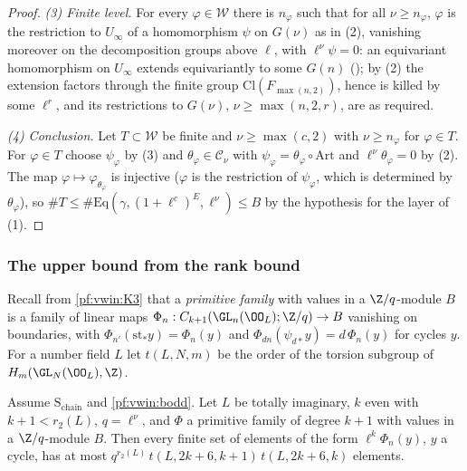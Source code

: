 \begin{proof}
\emph{(3) Finite level.} For every $\varphi\in\mathcal W$ there is $n_\varphi$ such that for all $\nu\ge n_\varphi$, $\varphi$ is the restriction to
$U_\infty$ of a homomorphism $\psi$ on $G(\nu)$ as in (2), vanishing moreover on the decomposition groups above $\ell$, with
$\ell^\nu\psi=0$: an equivariant homomorphism on $U_\infty$ extends equivariantly to some $G(n)$
(); by (2) the extension factors through the finite group $\mathrm{Cl}(F_{\max(n,2)})$, hence is killed
by some $\ell^r$, and its restrictions to $G(\nu)$, $\nu\ge\max(n,2,r)$, are as required.

\emph{(4) Conclusion.} Let $T\subset\mathcal W$ be finite and $\nu\ge\max(c,2)$ with $\nu\ge n_\varphi$ for $\varphi\in T$. For $\varphi\in T$ choose
$\psi_\varphi$ by (3) and $\theta_\varphi\in\mathcal C_\nu$ with $\psi_\varphi=\theta_\varphi\circ\mathrm{Art}$ and $\ell^\nu\theta_\varphi=0$ by (2). The
map $\varphi\mapsto\varphi_{\theta_\varphi}$ is injective ($\varphi$ is the restriction of $\psi_\varphi$, which is determined by $\theta_\varphi$),
so $\#T\le\#\mathrm{Eq}(\gamma,(1+\ell^c)^E,\ell^\nu)\le B$ by the hypothesis for the layer of (1).
\end{proof}


\subsubsection{The upper bound from the rank bound}

Recall from \ref{pf:vwin:K3} that a \emph{primitive family} with values in a $\Z/q$-module $B$ is a family of linear maps
$\Phi_n:C_{k+1}(\GL_n(\OO_L);\Z/q)\to B$ vanishing on boundaries, with $\Phi_{n'}(\mathrm{st}_*y)=\Phi_n(y)$ and
$\Phi_{dn}(\psi_{d*}y)=d\,\Phi_n(y)$ for cycles $y$. For a number field $L$ let $t(L,N,m)$ be the order of the torsion subgroup
of $H_m(\GL_N(\OO_L),\Z)$.

\begin{proposition}\label{pf:vwin:supper}
Assume $\mathrm S_{\mathrm{chain}}$ and \cref{pf:vwin:bodd}. Let $L$ be totally imaginary, $k$ even with $k+1<r_2(L)$, $q=\ell^\nu$, and
$\Phi$ a primitive family of degree $k+1$ with values in a $\Z/q$-module $B$. Then every finite set of elements of the form
$\ell^k\Phi_n(y)$, $y$ a cycle, has at most $q^{r_2(L)}\,t(L,2k+6,k+1)\,t(L,2k+6,k)$ elements.
\end{proposition}

